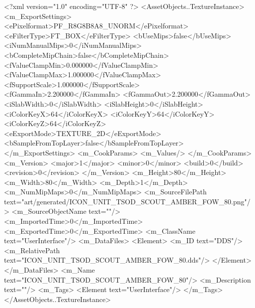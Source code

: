 <?xml version="1.0" encoding="UTF-8" ?>
<AssetObjects..TextureInstance>
	<m_ExportSettings>
		<ePixelformat>PF_R8G8B8A8_UNORM</ePixelformat>
		<eFilterType>FT_BOX</eFilterType>
		<bUseMips>false</bUseMips>
		<iNumManualMips>0</iNumManualMips>
		<bCompleteMipChain>false</bCompleteMipChain>
		<fValueClampMin>0.000000</fValueClampMin>
		<fValueClampMax>1.000000</fValueClampMax>
		<fSupportScale>1.000000</fSupportScale>
		<fGammaIn>2.200000</fGammaIn>
		<fGammaOut>2.200000</fGammaOut>
		<iSlabWidth>0</iSlabWidth>
		<iSlabHeight>0</iSlabHeight>
		<iColorKeyX>64</iColorKeyX>
		<iColorKeyY>64</iColorKeyY>
		<iColorKeyZ>64</iColorKeyZ>
		<eExportMode>TEXTURE_2D</eExportMode>
		<bSampleFromTopLayer>false</bSampleFromTopLayer>
	</m_ExportSettings>
	<m_CookParams>
		<m_Values/>
	</m_CookParams>
	<m_Version>
		<major>1</major>
		<minor>0</minor>
		<build>0</build>
		<revision>0</revision>
	</m_Version>
	<m_Height>80</m_Height>
	<m_Width>80</m_Width>
	<m_Depth>1</m_Depth>
	<m_NumMipMaps>0</m_NumMipMaps>
	<m_SourceFilePath text="art/generated/ICON_UNIT_TSOD_SCOUT_AMBER_FOW_80.png"/>
	<m_SourceObjectName text=""/>
	<m_ImportedTime>0</m_ImportedTime>
	<m_ExportedTime>0</m_ExportedTime>
	<m_ClassName text="UserInterface"/>
	<m_DataFiles>
		<Element>
			<m_ID text="DDS"/>
			<m_RelativePath text="ICON_UNIT_TSOD_SCOUT_AMBER_FOW_80.dds"/>
		</Element>
	</m_DataFiles>
	<m_Name text="ICON_UNIT_TSOD_SCOUT_AMBER_FOW_80"/>
	<m_Description text=""/>
	<m_Tags>
		<Element text="UserInterface"/>
	</m_Tags>
</AssetObjects..TextureInstance>
